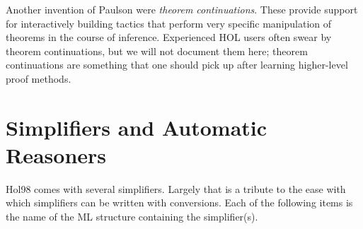 \documentclass[12pt,fleqn,a4paper]{report}
\begin{document}
Another invention of Paulson were {\it theorem continuations}. These
provide support for interactively building tactics that perform very
specific manipulation of theorems in the course of
inference. Experienced HOL users often swear by theorem continuations,
but we will not document them here; theorem continuations are something
that one should pick up after learning higher-level proof methods.

\section{Simplifiers and Automatic Reasoners}

Hol98 comes with several simplifiers. Largely that is a tribute to the
ease with which simplifiers can be written with conversions. Each of the
following items is the name of the ML structure containing the
simplifier(s).
\end{document}
